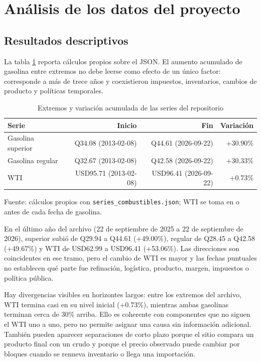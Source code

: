 \documentclass[11pt,letterpaper]{article}
\begin{document}
\section{Análisis de los datos del proyecto}
\subsection{Resultados descriptivos}
La tabla \ref{tab:descriptivo} reporta cálculos propios sobre el JSON. El aumento acumulado de gasolina entre extremos no debe leerse como efecto de un único factor: corresponde a más de trece años y coexistieron impuestos, inventarios, cambios de producto y políticas temporales.

\begin{table}[htbp]
\centering
\caption{Extremos y variación acumulada de las series del repositorio}
\label{tab:descriptivo}
\begin{tabular}{lrrr}
\toprule
Serie & Inicio & Fin & Variación \\
\midrule
Gasolina superior & Q34.08 (2013-02-08) & Q44.61 (2026-09-22) & +30.90\% \\
Gasolina regular & Q32.67 (2013-02-08) & Q42.58 (2026-09-22) & +30.33\% \\
WTI & USD95.71 (2013-02-08) & USD96.41 (2026-09-22) & +0.73\% \\
\bottomrule
\end{tabular}
\par\smallskip\footnotesize Fuente: cálculos propios con \texttt{series\_combustibles.json}; WTI se toma en o antes de cada fecha de gasolina.
\end{table}

En el último año del archivo (22 de septiembre de 2025 a 22 de septiembre de 2026), superior subió de Q29.94 a Q44.61 (+49.00\%), regular de Q28.45 a Q42.58 (+49.67\%) y WTI de USD62.99 a USD96.41 (+53.06\%). Las direcciones son coincidentes en ese tramo, pero el cambio de WTI es mayor y las fechas puntuales no establecen qué parte fue refinación, logística, producto, margen, impuestos o política pública.

Hay divergencias visibles en horizontes largos: entre los extremos del archivo, WTI termina casi en su nivel inicial (+0.73\%), mientras ambas gasolinas terminan cerca de 30\% arriba. Ello es coherente con componentes que no siguen el WTI uno a uno, pero no permite asignar una causa sin información adicional. También pueden aparecer separaciones de corto plazo porque el sitio compara un producto final con un crudo y porque el precio observado puede cambiar por bloques cuando se renueva inventario o llega una importación.
\end{document}
